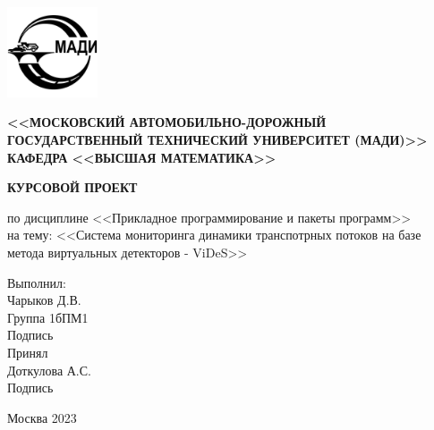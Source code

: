 \begin{titlepage}
\begin{center}
\includegraphics[width=0.2\textwidth]{images/university_logo.jpg}
\end{center}


\begin{center}
\noindent\begin{minipage}{0.14\textwidth}
\end{minipage}%
\begin{minipage}{0.86\textwidth}
\center{\small{\vspace{\baselineskip}}}
\end{minipage}
\small{\textbf{<<МОСКОВСКИЙ АВТОМОБИЛЬНО-ДОРОЖНЫЙ ГОСУДАРСТВЕННЫЙ ТЕХНИЧЕСКИЙ УНИВЕРСИТЕТ (МАДИ)>>}}\\
\vspace{1cm}
\scriptsize{{\textbf{КАФЕДРА <<ВЫСШАЯ МАТЕМАТИКА>> }}}
\vspace{1cm}
\vspace{\baselineskip}
    
\small{\textbf{КУРСОВОЙ ПРОЕКТ}}\\
\vspace{0.2 cm}

по дисциплине <<Прикладное программирование и пакеты программ>>\\
на тему: 
<<Система мониторинга динамики транспотрных потоков на базе метода виртуальных детекторов - ViDeS>>
\end{center}
\vfill
\begin{flushright}
    
Выполнил:\\
Чарыков Д.В.\\
Группа 1бПМ1\\
Подпись\\
\vspace{1cm}
Принял\\
Доткулова А.С.\\
\vspace{1cm}
Подпись
\end{flushright}


\vspace{1cm}
\begin{center}
Москва 2023
\end{center}
\end{titlepage}